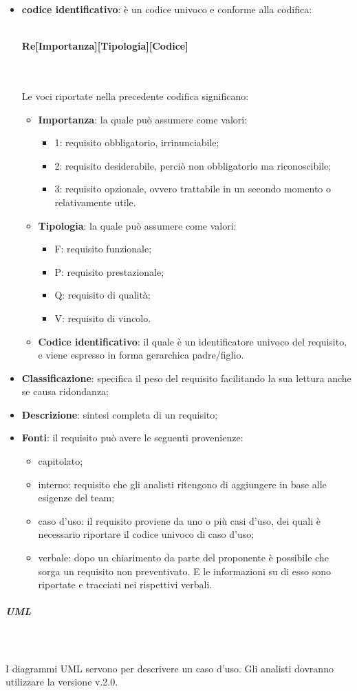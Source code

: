 				\begin{itemize}
					\item \textbf{codice identificativo}: è un codice univoco e conforme alla codifica: \\ \\
					\centerline{\textbf{Re[Importanza][Tipologia][Codice]}} \\ \\
					Le voci riportate nella precedente codifica significano: 
					\begin{itemize}
						\item \textbf{Importanza}: la quale può assumere come valori:
						\begin{itemize}
							\item 1: requisito obbligatorio, irrinunciabile;
							\item 2: requisito desiderabile, perciò non obbligatorio ma riconoscibile;
							\item 3: requisito opzionale, ovvero trattabile in un secondo momento o relativamente utile.
						\end{itemize}
						\item \textbf{Tipologia}: la quale può assumere come valori:
						\begin{itemize}
							\item F: requisito funzionale;
							\item P: requisito prestazionale;
							\item Q: requisito di qualità;
							\item V: requisito di vincolo.
						\end{itemize}
						\item \textbf{Codice identificativo}: il quale è un identificatore univoco del requisito, e viene espresso in forma gerarchica padre/figlio.
					\end{itemize}
					\item \textbf{Classificazione}: specifica il peso del requisito facilitando la sua lettura anche se causa ridondanza;
					\item \textbf{Descrizione}: sintesi completa di un requisito;
					\item \textbf{Fonti}: il requisito può avere le seguenti provenienze:
					\begin{itemize}
						\item capitolato;
						\item interno: requisito che gli analisti ritengono di aggiungere in base alle esigenze del team;
						\item caso d'uso: il requisito proviene da uno o più casi d'uso, dei quali è necessario riportare il codice univoco di caso d'uso;
						\item verbale: dopo un chiarimento da parte del proponente è possibile che sorga un requisito non preventivato. E le informazioni su di esso sono riportate e tracciati nei rispettivi verbali.
					\end{itemize}
				\end{itemize} 
				\subparagraph*{UML} \mbox{} \\ \mbox{} \\
				I diagrammi UML servono per descrivere un caso d'uso. Gli analisti dovranno utilizzare la versione v.2.0.
				\pagebreak
